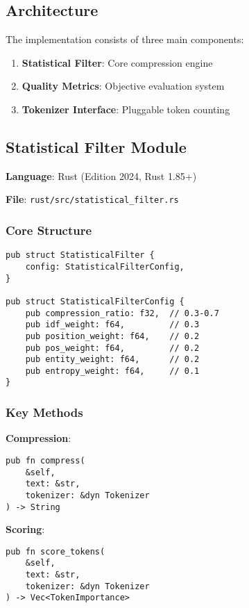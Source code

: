 \label{sec:implementation}

\subsection{Architecture}

The implementation consists of three main components:

\begin{enumerate}
    \item \textbf{Statistical Filter}: Core compression engine
    \item \textbf{Quality Metrics}: Objective evaluation system
    \item \textbf{Tokenizer Interface}: Pluggable token counting
\end{enumerate}

\subsection{Statistical Filter Module}

\textbf{Language}: Rust (Edition 2024, Rust 1.85+)

\textbf{File}: \texttt{rust/src/statistical\_filter.rs}

\subsubsection{Core Structure}

\begin{verbatim}
pub struct StatisticalFilter {
    config: StatisticalFilterConfig,
}

pub struct StatisticalFilterConfig {
    pub compression_ratio: f32,  // 0.3-0.7
    pub idf_weight: f64,         // 0.3
    pub position_weight: f64,    // 0.2
    pub pos_weight: f64,         // 0.2
    pub entity_weight: f64,      // 0.2
    pub entropy_weight: f64,     // 0.1
}
\end{verbatim}

\subsubsection{Key Methods}

\textbf{Compression}:
\begin{verbatim}
pub fn compress(
    &self,
    text: &str,
    tokenizer: &dyn Tokenizer
) -> String
\end{verbatim}

\textbf{Scoring}:
\begin{verbatim}
pub fn score_tokens(
    &self,
    text: &str,
    tokenizer: &dyn Tokenizer
) -> Vec<TokenImportance>
\end{verbatim}


